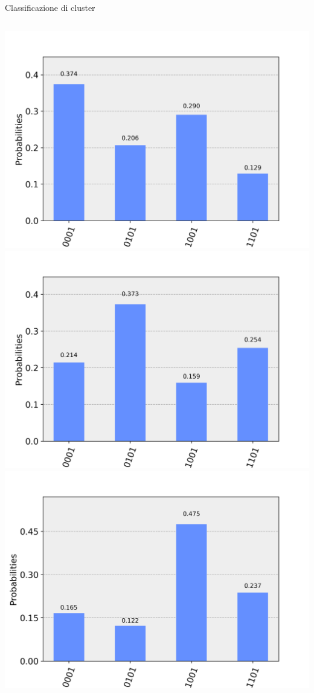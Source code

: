 \documentclass{beamer}
\begin{document}
    \begin{frame}{Classificazione di cluster}
        \begin{columns}
            \includegraphics[width=.9\linewidth]{gfx/Clusters/Simulated/green}
            \includegraphics[width=.9\linewidth]{gfx/Clusters/Simulated/blue}
            \includegraphics[width=.9\linewidth]{gfx/Clusters/Simulated/black}

\end{columns}
\end{frame}
\end{document}
